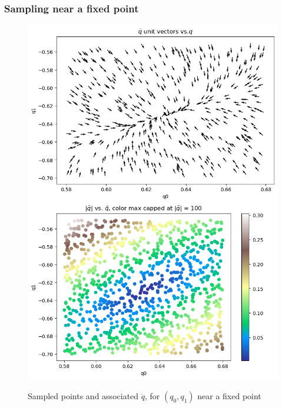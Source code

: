 \documentclass[]{article}
\begin{document}
\begin{appendices}
\subsubsection{Sampling near a fixed point}

\begin{figure}[H]
	\caption{Sampled points and associated $\ddot{q}$, for $(q_0,q_1)$ near a fixed point}
	\centering
	\includegraphics[scale=0.40]{2D-sampling-fixed-point.png}
	\label{fig:2D-sampling-fixed-point}
\end{figure}


\end{appendices}
\end{document}
